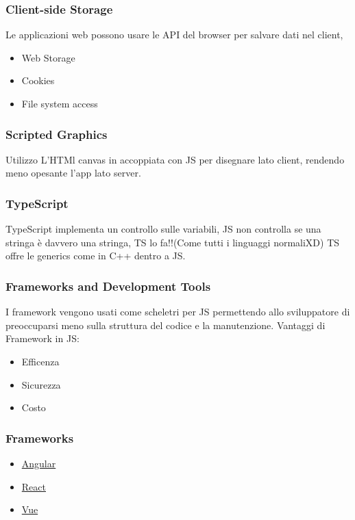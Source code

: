 \subsubsection{Client-side Storage}
Le applicazioni web possono usare le API del browser per salvare dati nel client,
\begin{itemize}
    \item Web Storage
    \item Cookies
    \item File system access
\end{itemize}

\subsubsection{Scripted Graphics}
Utilizzo L'HTMl canvas in accoppiata con JS per disegnare lato client, rendendo meno opesante l'app lato server.

\subsubsection{TypeScript}
TypeScript implementa un controllo sulle variabili, JS non controlla se una stringa è davvero una stringa, TS lo fa!!(Come tutti i linguaggi normaliXD)
TS offre le generics come in C++ dentro a JS.

\subsubsection{Frameworks and Development Tools}
I framework vengono usati come scheletri per JS permettendo allo sviluppatore di preoccuparsi meno sulla struttura del codice e la manutenzione.
Vantaggi di Framework in JS:
\begin{itemize}
    \item Efficenza
    \item Sicurezza
    \item Costo
\end{itemize}

\subsubsection{Frameworks}
\begin{itemize}
    \item \href{https://angular.io/}{Angular}
    \item \href{https://reactjs.org/}{React}
    \item \href{https://v3.vuejs.org/}{Vue}
\end{itemize}

